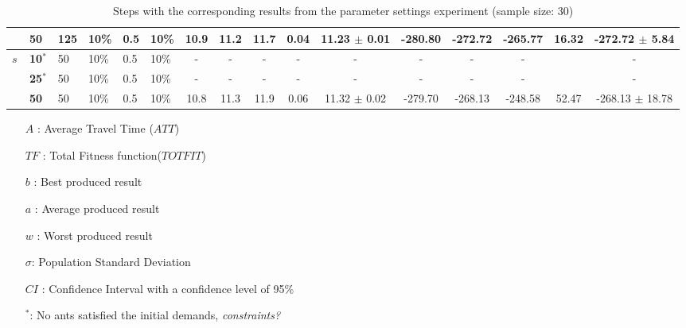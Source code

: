 \begin{sidewaystable}
\begin{tabular}{|l|l|l|l|l|l||c|c|c|c|c|c|c|c|c|c|}
    ~   & 50 &\textbf{125} & 10\% & 0.5 & 10\% & 10.9 & 11.2 & 11.7 & 0.04 & 11.23 $\pm$ 0.01 & -280.80 & -272.72 & -265.77 & 16.32 & -272.72 $\pm$ 5.84 \\
    \hline
    $s$ & \textbf{10$^*$} & 50 & 10\% & 0.5 & 10\% & - & - & - & - & - & - & - & - &  & - \\
    ~ & \textbf{25$^*$} & 50 & 10\% & 0.5 & 10\% & - & - & - & - & - & - & - & - &  & -  \\
    ~ & \textbf{50} & 50 & 10\% & 0.5 & 10\% & 10.8 & 11.3 & 11.9 & 0.06 & 11.32 $\pm$ 0.02 & -279.70 & -268.13 & -248.58 & 52.47 & -268.13 $\pm$  18.78\\
    \hline
    \end{tabular}
    \caption {Steps with the corresponding results from the parameter settings experiment (sample size: 30)}
    \tiny
    \begin{itemize}[noitemsep]
    \item[$A$ :] Average Travel Time ($ATT$)
    \item[$TF$ :] Total Fitness function($TOTFIT$)
    \item[$b$ :] Best produced result
    \item[$a$ :] Average produced result
    \item[$w$ :] Worst produced result
    \item[$\sigma$:] Population Standard Deviation 
    \item[$CI$ :] Confidence Interval with a confidence level of 95\%
    \item[$^*$:] No ants satisfied the initial demands, \emph{\color{blue} constraints?}
    \end{itemize}
    \label{table:pm1}
\end{sidewaystable}


